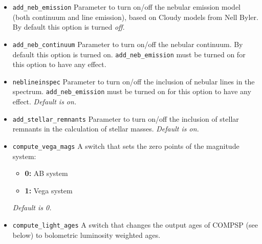 \documentclass[]{article}
\begin{document}
\begin{itemize}
\item \texttt{add\_neb\_emission}
Parameter to turn on/off the nebular emission model (both continuum and line
emission), based on Cloudy models from Nell Byler.  By default this option is
turned \emph{off}.
\end{itemize}

\begin{itemize}
\item \texttt{add\_neb\_continuum}
Parameter to turn on/off the nebular continuum.  By default this option is
turned on.  \texttt{add\_neb\_emission} must be turned on for this option to
have any effect.
\end{itemize}

\begin{itemize}
\item \texttt{neblineinspec}
Parameter to turn on/off the inclusion of nebular lines in the spectrum.
\texttt{add\_neb\_emission} must be turned on for this option to have any
effect.
{\it Default is on.}
\end{itemize}

\begin{itemize}
\item \texttt{add\_stellar\_remnants}
Parameter to turn on/off the inclusion of stellar remnants in the calculation of
stellar masses.
{\it Default is on.}
\end{itemize}

\begin{itemize}
\item \texttt{compute\_vega\_mags}
A switch that sets the zero points of the magnitude system:
  \begin{itemize}
  \item {\bf 0:}  AB system
  \item {\bf 1:}  Vega system
  \end{itemize}
{\it Default is 0.}
\end{itemize}


\begin{itemize}
\item \texttt{compute\_light\_ages}
A switch that changes the output ages of COMPSP (see below) to bolometric
luminosity weighted ages.
\end{itemize}
\end{document}
